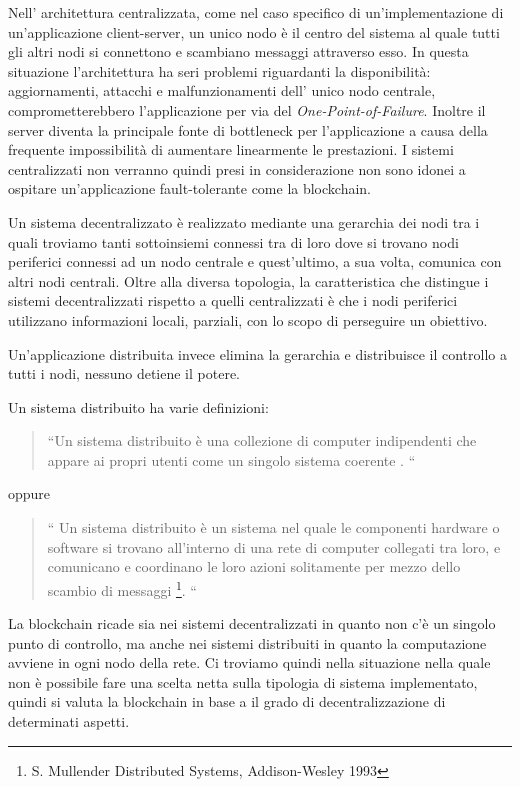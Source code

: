 	Nell' architettura centralizzata, come nel caso specifico di un'implementazione di un'applicazione client-server, un unico nodo è il centro del sistema al quale tutti gli altri nodi si connettono e scambiano messaggi attraverso esso.
	In questa situazione l'architettura ha seri problemi riguardanti la disponibilità: aggiornamenti, attacchi e malfunzionamenti dell' unico nodo centrale, comprometterebbero l'applicazione per via del \textit{One-Point-of-Failure}. Inoltre il server diventa la principale fonte di bottleneck per l'applicazione a causa della frequente impossibilità di aumentare linearmente le prestazioni.	
	I sistemi centralizzati non verranno quindi presi in considerazione non sono idonei a ospitare un'applicazione fault-tolerante come la blockchain.
	
	
	Un sistema decentralizzato è realizzato mediante una gerarchia dei nodi tra i quali troviamo tanti sottoinsiemi connessi tra di loro dove si trovano nodi periferici connessi ad un nodo centrale e quest'ultimo, a sua volta, comunica con altri nodi centrali. Oltre alla diversa topologia, la caratteristica che distingue i sistemi decentralizzati rispetto a quelli centralizzati è che i nodi periferici utilizzano informazioni locali, parziali, con lo scopo di perseguire un obiettivo. 
	
	Un'applicazione distribuita invece elimina la gerarchia e distribuisce il controllo a tutti i nodi, nessuno detiene il potere. 
	
	Un sistema distribuito ha varie definizioni:
	
	\begin{quotation}
		``Un sistema distribuito è una collezione di computer indipendenti che appare ai propri utenti come un singolo sistema coerente \cite{tanenbaum2007sistemi}.
		``
	\end{quotation} 
	oppure
	\begin{quotation}
		``
		Un sistema distribuito è un sistema nel quale le componenti hardware o software si trovano all’interno di una rete di computer collegati tra loro, e comunicano e coordinano le loro azioni solitamente per mezzo dello scambio di messaggi \footnote{S. Mullender Distributed Systems, Addison-Wesley 1993}.
		``
	\end{quotation}
	
	La blockchain ricade sia nei sistemi decentralizzati in quanto non c'è un singolo punto di controllo, ma anche nei sistemi distribuiti in quanto la computazione avviene in ogni nodo della rete. Ci troviamo quindi nella situazione nella quale non è possibile fare una scelta netta sulla tipologia di sistema implementato, quindi si valuta la blockchain in base a il grado di decentralizzazione di determinati aspetti.
	
